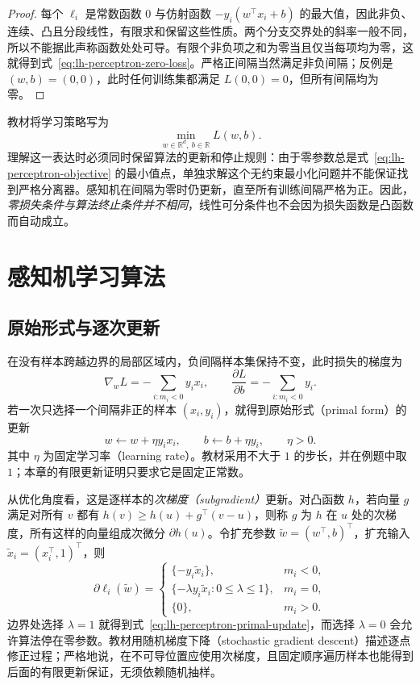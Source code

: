 \begin{proof}
每个 $\ell_i$ 是常数函数 $0$ 与仿射函数 $-y_i(w^\top x_i+b)$ 的最大值，因此非负、连续、凸且分段线性，有限求和保留这些性质。两个分支交界处的斜率一般不同，所以不能据此声称函数处处可导。有限个非负项之和为零当且仅当每项均为零，这就得到式~\eqref{eq:lh-perceptron-zero-loss}。严格正间隔当然满足非负间隔；反例是 $(w,b)=(0,0)$，此时任何训练集都满足 $L(0,0)=0$，但所有间隔均为零。
\end{proof}

教材将学习策略写为
\begin{equation}
\label{eq:lh-perceptron-objective}
\min_{w\in\mathbb R^d,\ b\in\mathbb R} L(w,b).
\end{equation}
理解这一表达时必须同时保留算法的更新和停止规则：由于零参数总是式~\eqref{eq:lh-perceptron-objective} 的最小值点，单独求解这个无约束最小化问题并不能保证找到严格分离器。感知机在间隔为零时仍更新，直至所有训练间隔严格为正。因此，\emph{零损失条件与算法终止条件并不相同}，线性可分条件也不会因为损失函数是凸函数而自动成立。

\section{感知机学习算法}
\label{sec:lh-perceptron-algorithm}

\subsection{原始形式与逐次更新}
\label{subsec:lh-perceptron-primal}

在没有样本跨越边界的局部区域内，负间隔样本集保持不变，此时损失的梯度为
\[
\nabla_w L=-\sum_{i:m_i<0}y_i x_i,
\qquad
\frac{\partial L}{\partial b}=-\sum_{i:m_i<0}y_i.
\]
若一次只选择一个间隔非正的样本 $(x_i,y_i)$，就得到原始形式（primal form）的更新
\begin{equation}
\label{eq:lh-perceptron-primal-update}
w\leftarrow w+\eta y_i x_i,
\qquad
b\leftarrow b+\eta y_i,
\qquad \eta>0.
\end{equation}
其中 $\eta$ 为固定学习率（learning rate）。教材采用不大于 $1$ 的步长，并在例题中取 $1$；本章的有限更新证明只要求它是固定正常数。

从优化角度看，这是逐样本的\emph{次梯度（subgradient）}更新。对凸函数 $h$，若向量 $g$ 满足对所有 $v$ 都有 $h(v)\geq h(u)+g^\top(v-u)$，则称 $g$ 为 $h$ 在 $u$ 处的次梯度，所有这样的向量组成次微分 $\partial h(u)$。令扩充参数 $\widetilde w=(w^\top,b)^\top$，扩充输入 $\widetilde x_i=(x_i^\top,1)^\top$，则
\[
\partial\ell_i(\widetilde w)=
\begin{cases}
\{-y_i\widetilde x_i\},&m_i<0,\\
\{-\lambda y_i\widetilde x_i:0\leq\lambda\leq1\},&m_i=0,\\
\{0\},&m_i>0.
\end{cases}
\]
边界处选择 $\lambda=1$ 就得到式~\eqref{eq:lh-perceptron-primal-update}，而选择 $\lambda=0$ 会允许算法停在零参数。教材用随机梯度下降（stochastic gradient descent）描述逐点修正过程；严格地说，在不可导位置应使用次梯度，且固定顺序遍历样本也能得到后面的有限更新保证，无须依赖随机抽样。

